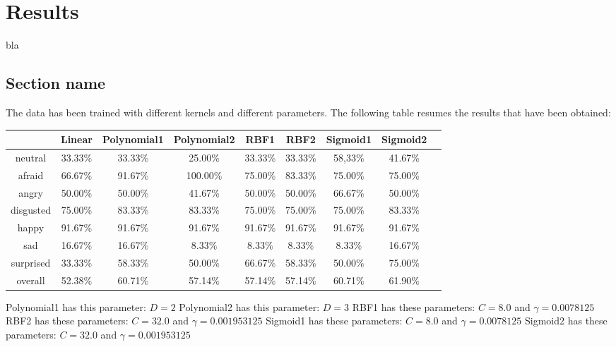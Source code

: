 \chapter{Results}
\label{chap:eval_results}

\noindent bla

\section{Section name}

\vspace{\baselineskip}
\noindent The data has been trained with different kernels and different parameters. The following table resumes the results that have been obtained:
\newline

\begin{tabular}{|c|c|c|c|c|c|c|c|c|}
  \hline
    & Linear & Polynomial1 & Polynomial2 & RBF1 & RBF2 & Sigmoid1 & Sigmoid2 \\
  \hline
  neutral & 33.33\% & 33.33\% & 25.00\% & 33.33\% & 33.33\% & 58,33\% & 41.67\% \\
  afraid & 66.67\% & 91.67\% & 100.00\% & 75.00\% & 83.33\% & 75.00\% & 75.00\% \\
  angry & 50.00\% & 50.00\% & 41.67\% & 50.00\% & 50.00\% & 66.67\% & 50.00\% \\
  disgusted & 75.00\% & 83.33\% & 83.33\% & 75.00\% & 75.00\% & 75.00\% & 83.33\% \\
  happy & 91.67\% & 91.67\% & 91.67\% & 91.67\% & 91.67\% & 91.67\% & 91.67\% \\
  sad & 16.67\% & 16.67\% & 8.33\% & 8.33\% & 8.33\% & 8.33\% & 16.67\% \\
  surprised & 33.33\% & 58.33\% & 50.00\% & 66.67\% & 58.33\% & 50.00\% & 75.00\% \\
  overall & 52.38\% & 60.71\% & 57.14\% & 57.14\% & 57.14\% & 60.71\% & 61.90\% \\
  \hline
\end{tabular}

\vspace{\baselineskip}
\noindent Polynomial1 has this parameter: $ D = 2 $
\newline
\noindent Polynomial2 has this parameter: $ D = 3 $
\newline
\noindent RBF1 has these parameters: $ C = 8.0 $ and $ \gamma = 0.0078125 $
\newline
\noindent RBF2 has these parameters: $ C = 32.0 $ and $ \gamma = 0.001953125 $ 
\newline
\noindent Sigmoid1 has these parameters: $ C = 8.0 $ and $ \gamma = 0.0078125 $
\newline
\noindent Sigmoid2 has these parameters: $ C = 32.0 $ and $ \gamma = 0.001953125 $
\newline

